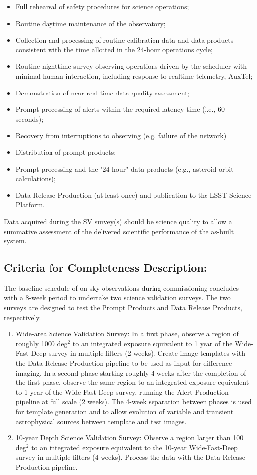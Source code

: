 \begin{itemize}
\item Full rehearsal of safety procedures for science operations;
\item Routine daytime maintenance of the observatory;
\item Collection and processing of routine calibration data and data products consistent with the time allotted in the 24-hour operations cycle;
\item Routine nighttime survey observing operations driven by the scheduler with minimal human interaction, including response to realtime telemetry, AuxTel;
\item Demonstration of near real time data quality assessment;
\item Prompt processing of alerts within the required latency time (i.e., 60 seconds);
\item Recovery from interruptions to observing (e.g. failure of the network)
\item Distribution of prompt products;
\item Prompt processing and the "24-hour" data products (e.g., asteroid orbit calculations);
\item Data Release Production (at least once) and publication to the LSST Science Platform.
\end{itemize}

Data acquired during the SV survey(s) should be science quality to allow a summative assessment of the delivered scientific performance of the as-built system.

\subsection{Criteria for Completeness Description:}

The baseline schedule of on-sky observations during commissioning concludes with a 8-week period to undertake two science validation surveys. The two surveys are designed to test the Prompt Products and Data Release Products, respectively.

\begin{enumerate}
\item Wide-area Science Validation Survey: In a first phase, observe a region of roughly 1000 deg$^2$ to an integrated exposure equivalent to 1 year of the Wide-Fast-Deep survey in multiple filters (2 weeks). Create image templates with the Data Release Production pipeline to be used as input for difference imaging. In a second phase starting roughly 4 weeks after the completion of the first phase, observe the same region to an integrated exposure equivalent to 1 year of the Wide-Fast-Deep survey, running the Alert Production pipeline at full scale (2 weeks). The 4-week separation between phases is used for template generation and to allow evolution of variable and transient astrophysical sources between template and test images.
\item 10-year Depth Science Validation Survey: Observe a region larger than 100 deg$^2$ to an integrated exposure equivalent to the 10-year Wide-Fast-Deep survey in multiple filters (4 weeks). Process the data with the Data Release Production pipeline.
\end{enumerate}

